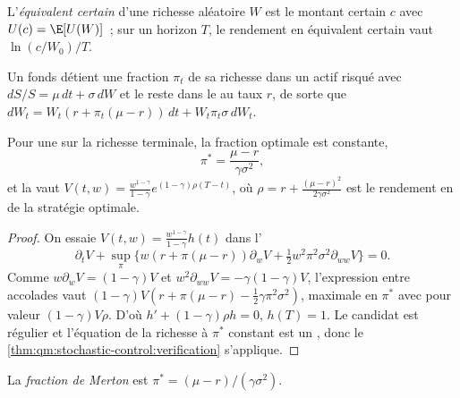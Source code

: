 \begin{definition}\label{def:qm:stochastic-control:ce}
L'\emph{équivalent certain} d'une richesse aléatoire $W$ est le montant certain $c$
avec $U(c) = \E[U(W)]$~; sur un horizon $T$, le rendement en équivalent certain vaut $\ln(c/W_0)/T$.
\end{definition}

Un fonds détient une fraction $\pi_t$ de sa richesse dans un actif risqué avec $dS/S = \mu\,dt + \sigma\,dW$ et le reste dans le
 au taux $r$, de sorte que $dW_t = W_t(r + \pi_t(\mu - r))\,dt + W_t\pi_t\sigma\,dW_t$.

\begin{theorem}[Merton]\label{thm:qm:stochastic-control:merton}
Pour une  sur la richesse terminale, la fraction optimale est constante,
\[
\pi^* = \frac{\mu - r}{\gamma\sigma^2},
\]
et la  vaut $V(t, w) = \frac{w^{1-\gamma}}{1-\gamma}e^{(1-\gamma)\rho(T-t)}$, où $\rho = r + \frac{(\mu -
r)^2}{2\gamma\sigma^2}$ est le rendement en  de la stratégie optimale.
\end{theorem}

\begin{proof}
On essaie $V(t, w) = \frac{w^{1-\gamma}}{1-\gamma}h(t)$ dans l'
\[
\partial_tV + \sup_\pi\bigl\{w(r + \pi(\mu - r))\partial_wV + \tfrac12w^2\pi^2\sigma^2\partial_{ww}V\bigr\} = 0.
\] Comme $w\partial_wV = (1 - \gamma)V$ et $w^2\partial_{ww}V = -\gamma(1 - \gamma)V$, l'expression entre accolades vaut
$(1 - \gamma)V(r + \pi(\mu - r) - \tfrac12\gamma\pi^2\sigma^2)$, maximale en $\pi^*$ avec pour valeur $(1 - \gamma)V\rho$. D'où $h' +
(1 - \gamma)\rho h = 0$, $h(T) = 1$. Le candidat est régulier et l'équation de la richesse à $\pi^*$ constant est un
, donc le \cref{thm:qm:stochastic-control:verification} s'applique.
\end{proof}

\begin{definition}\label{def:qm:stochastic-control:fraction}
La \emph{fraction de Merton} est $\pi^* = (\mu - r)/(\gamma\sigma^2)$.
\end{definition}

